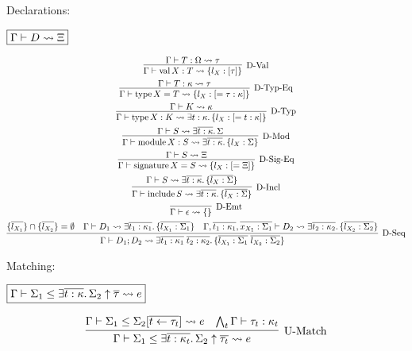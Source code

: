 Declarations:

$\fbox{$\Gamma \vdash D \rightsquigarrow \Xi$}$

\begin{gather*}
  \infer[\text{D-Val}]{\Gamma \vdash \symval X: T \elaborate \{l_X: [\tau]\}}{
    \Gamma \vdash T: \Omega \elaborate \tau
  }
  \\
  \infer[\text{D-Typ-Eq}]{\Gamma \vdash \symtype X = T \elaborate \{l_X: [= \tau: \kappa]\}}{
    \Gamma \vdash T: \kappa \elaborate \tau
  }
  \\
  \infer[\text{D-Typ}]{\Gamma \vdash \symtype X: K \elaborate \exists t: \kappa\ldotp \{l_X: [= t: \kappa]\}}{
    \Gamma \vdash K \elaborate \kappa
  }
  \\
  \infer[\text{D-Mod}]{\Gamma \vdash \symmodule X: S \elaborate \exists \overline{t: \kappa}\ldotp \{l_X: \Sigma\}}{
    \Gamma \vdash S \elaborate \exists \overline{t: \kappa}\ldotp \Sigma
  }
  \\
  \infer[\text{D-Sig-Eq}]{\Gamma \vdash \symsignature X = S \elaborate \{l_X: [= \Xi]\}}{
    \Gamma \vdash S \elaborate \Xi
  }
  \\
  \infer[\text{D-Incl}]{\Gamma \vdash \syminclude S \elaborate \exists \overline{t: \kappa}\ldotp \{\overline{l_X: \Sigma}\}}{
    \Gamma \vdash S \elaborate \exists \overline{t: \kappa}\ldotp \{\overline{l_X: \Sigma}\}
  }
  \\
  \infer[\text{D-Emt}]{\Gamma \vdash \epsilon \elaborate \{\}}{}
  \\
  \infer[\text{D-Seq}]{\Gamma \vdash D_1; D_2 \elaborate \exists \overline{t_1: \kappa_1}\; \overline{t_2: \kappa_2}\ldotp \{\overline{l_{X_1}: \Sigma_1}\; \overline{l_{X_2}: \Sigma_2}\}}{
    \{\overline{l_{X_1}}\} \cap \{\overline{l_{X_2}}\} = \emptyset
    &
    \Gamma \vdash D_1 \elaborate \exists \overline{t_1: \kappa_1}\ldotp \{\overline{l_{X_1}: \Sigma_1}\}
    &
    \Gamma, \overline{t_1: \kappa_1}, \overline{x_{X_1}: \Sigma_1} \vdash D_2 \elaborate \exists \overline{t_2: \kappa_2}\ldotp \{\overline{l_{X_2}: \Sigma_2}\}
  }
\end{gather*}

Matching:

$\fbox{$\Gamma \vdash \Sigma_1 \leq \exists \overline{t: \kappa}\ldotp \Sigma_2 \uparrow \overline{\tau} \rightsquigarrow e$}$

\begin{gather*}
  \infer[\text{U-Match}]{\Gamma \vdash \Sigma_1 \leq \exists \overline{t: \kappa_t}\ldotp \Sigma_2 \uparrow \overline{\tau_t} \elaborate e}{
    \Gamma \vdash \Sigma_1 \leq \Sigma_2[\overline{t \assign \tau_t}] \elaborate e
    &
    \bigwedge_t \Gamma \vdash \tau_t: \kappa_t
  }
\end{gather*}

